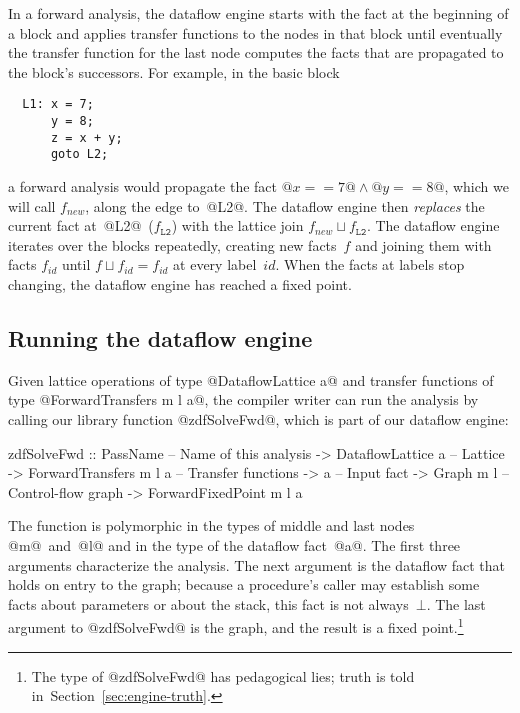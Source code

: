 \documentclass[blockstyle,preprint,natbib,nocopyrightspace]{sigplanconf}
\newcommand\join{\sqcup}
\newcommand{\authornote}[1]{{\em #1}}
\def\authornote#1{\unskip\relax}
\newcommand{\norman}[1]{\authornote{NR: #1}}
\let\remark\norman
\newcommand\secref[1]{Section~\ref{sec:#1}}
\newcommand\seclabel[1]{\label{sec:#1}}
\begin{document}
In a forward analysis, the dataflow engine starts with the fact at the
beginning of a block and applies transfer functions to the nodes in
that block until eventually the transfer function for the last node
computes the facts that are propagated to the block's successors.
For example, in the basic block
\begin{verbatim}
  L1: x = 7;
      y = 8;
      z = x + y;
      goto L2;
\end{verbatim}
a forward analysis would propagate the fact 
$@x == 7@ \land @y == 8@$, which we will call $f_{\mathit{new}}$,
along the edge to~@L2@. 
The dataflow engine then \emph{replaces} the current fact
at~@L2@~($f_{\mathtt{L2}}$) with the lattice join $f_{\mathit{new}}
\join f_{\mathtt{L2}}$. 
The dataflow engine iterates over the blocks repeatedly, creating new
facts~$f$ and joining them with facts $f_{\mathit{id}}$ until
\mbox{$f \join f_{\mathit{id}} = f_{\mathit{id}}$} at every label~$\mathit{id}$.
When the facts at labels stop changing, the dataflow
engine has reached a fixed point.




\subsection{Running the dataflow engine}

\seclabel{zdfSolveFwd}

Given lattice operations of type @DataflowLattice a@
and transfer functions of type @ForwardTransfers m l a@,
the compiler writer can run the analysis by calling our library
function @zdfSolveFwd@, which is part of our dataflow engine:
\begin{code}
 zdfSolveFwd 
  :: PassName               -- Name of this analysis
  -> DataflowLattice a      -- Lattice
  -> ForwardTransfers m l a -- Transfer functions
  -> a                      -- Input fact
  -> Graph m l              -- Control-flow graph
  -> ForwardFixedPoint m l a
\end{code}
The function is polymorphic in the types of middle and last nodes
@m@~and~@l@ and in the type of the dataflow fact~@a@.
The first three arguments characterize the analysis.
The next argument is the dataflow fact that holds on entry to the
graph;
because a procedure's caller may establish some facts about
parameters or about the stack,
this fact
is not always~$\bot$.
The last argument to @zdfSolveFwd@ is the graph, and the result is a 
fixed point.\footnote
{The type of @zdfSolveFwd@ has pedagogical lies;
truth is told in~\secref{engine-truth}.}
\end{document}
